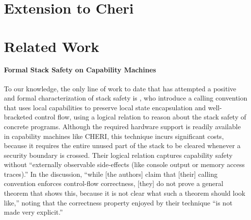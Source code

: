 \documentclass[acmsmall,review,anonymous]{acmart}\settopmatter{printfolios=true,printccs=false,printacmref=false}
\begin{document}
{\section{Extension to Cheri}
\label{sec:cheri}


\section{Related Work}
\label{sec:relwork}


\paragraph{Formal Stack Safety on Capability Machines}
%
To our knowledge, the only line of work to date that has attempted
a positive and formal characterization of
stack safety is \citet{Skorstengaard+19b}, who introduce a calling
convention that uses local capabilities to preserve local state
encapsulation and well-bracketed control flow, using a logical
relation to reason about the stack safety of concrete
programs. Although the required hardware support is readily available
in capability machines like CHERI, this technique incurs significant
costs, because it requires the entire unused part of the stack to be
cleared whenever a security boundary is crossed. Their logical
relation captures capability safety without ``externally observable
side-effects (like console output or memory access traces).'' In the
discussion, ``while [the authors] claim that [their] calling
convention enforces control-flow correctness, [they] do not prove a
general theorem that shows this, because it is not clear what such a
theorem should look like,'' noting that the correctness property
enjoyed by their technique ``is not made very explicit.''

}
\end{document}
